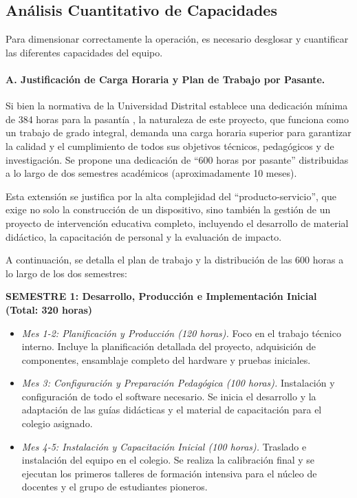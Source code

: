 \subsection{Análisis Cuantitativo de Capacidades}

Para dimensionar correctamente la operación, es necesario desglosar y
cuantificar las diferentes capacidades del equipo.

\paragraph{A. Justificación de Carga Horaria y Plan de Trabajo por Pasante.}
Si bien la normativa de la Universidad Distrital establece una dedicación mínima
de 384 horas para la pasantía \cite{ud_2022_acuerdo012}, la naturaleza de este
proyecto, que funciona como un trabajo de grado integral, demanda una carga
horaria superior para garantizar la calidad y el cumplimiento de todos sus
objetivos técnicos, pedagógicos y de investigación. Se propone una dedicación de
``600 horas por pasante'' distribuidas a lo largo de dos semestres académicos
(aproximadamente 10 meses).

Esta extensión se justifica por la alta complejidad del ``producto-servicio'',
que exige no solo la construcción de un dispositivo, sino también la gestión de
un proyecto de intervención educativa completo, incluyendo el desarrollo de
material didáctico, la capacitación de personal y la evaluación de impacto.

A continuación, se detalla el plan de trabajo y la distribución de las 600 horas
a lo largo de los dos semestres:

\vspace{0.5cm} %

\textbf{SEMESTRE 1: Desarrollo, Producción e Implementación Inicial (Total: 320 horas)}
\begin{itemize}
  \item \textit{Mes 1-2: Planificación y Producción (120 horas).} Foco en el
    trabajo técnico interno. Incluye la planificación detallada del proyecto,
    adquisición de componentes, ensamblaje completo del hardware y pruebas
    iniciales.

  \item \textit{Mes 3: Configuración y Preparación Pedagógica (100 horas).}
    Instalación y configuración de todo el software necesario. Se inicia el
    desarrollo y la adaptación de las guías didácticas y el material de
    capacitación para el colegio asignado.

  \item \textit{Mes 4-5: Instalación y Capacitación Inicial (100 horas).}
    Traslado e instalación del equipo en el colegio. Se realiza la calibración
    final y se ejecutan los primeros talleres de formación intensiva para el
    núcleo de docentes y el grupo de estudiantes pioneros.
\end{itemize}

